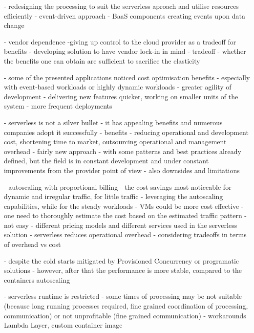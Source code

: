 \label{chapter:serverless-suitability-operation-types}
- redesigning the processing to suit the serverless aproach and utilise resources efficiently
- event-driven approach - BaaS components creating events upon data change

\label{chapter:serverless-suitability-vendor-dependence}
- vendor dependence -giving up control to the cloud provider as a tradeoff for benefits - developing solution to have vendor lock-in in mind
- tradeoff - whether the benefits one can obtain are sufficient to sacrifice the elasticity

\label{chapter:serverless-suitability-for-web-based-workloads}
- some of the presented applications noticed cost optimisation benefits - especially with event-based workloads or highly dynamic workloads
- greater agility of development - delivering new features quicker, working on smaller units of the system - more frequent deployments

\label{chapter:serverless-suitability}
- serverless is not a silver bullet - it has appealing benefits and numerous companies adopt it successfully
- benefits - reducing operational and development cost, shortening time to market, outsourcing operational and management overhead
- fairly new approach - with some patterns and best practices already defined, but the field is in constant development and under constant improvements from the provider point of view
- also downsides and limitations

\label{chapter:serverless-suitability-utilisation-patterns}
- autoscaling with proportional billing - the cost savings most noticeable for dynamic and irregular traffic, for little traffic - leveraging the autoscaling capabilities, while for the steady workloads - VMs could be more cost effective
- one need to thoroughly estimate the cost based on the estimated traffic pattern - not easy - different pricing models and different services used in the serverless solution
- serverless reduces operational overhead - considering tradeoffs in terms of overhead vs cost

\label{chapter:serverless-suitability-processing-time}
- despite the cold starts mitigated by Provisioned Concurrency or programatic solutions - however, after that the performance is more stable, compared to the containers autoscaling

\label{chapter:serverless-processing-limitations-runtime-and-data-restrictions}
- serverless runtime is restricted - some times of processing may be not suitable (because long running processes required, fine grained coordination of processing, communication) or not unprofitable (fine grained communication) - workarounds Lambda Layer, custom container image

